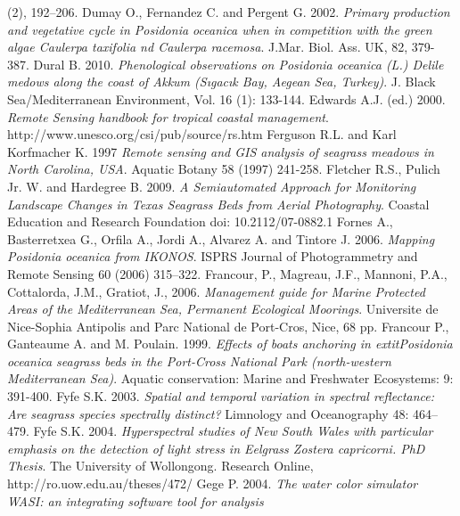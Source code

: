 \documentclass[10pt, a4paper]{article}
\begin{document}
\begin{thebibliography}{999}
(2), 192–206. \pageref{Duarte02}
Dumay O., Fernandez C. and Pergent G. 2002. \emph{Primary production and vegetative cycle
in \textit{Posidonia oceanica} when in competition with the green algae Caulerpa taxifolia nd
Caulerpa racemosa}. J.Mar. Biol. Ass. UK, 82, 379-387. \pageref{Dumay02}
Dural B. 2010. \emph{Phenological observations on \textit{Posidonia oceanica} (L.) Delile medows
along the coast of Akkum (Sıgacık Bay, Aegean Sea, Turkey)}. J. Black Sea/Mediterranean
Environment, Vol. 16 (1): 133-144. \pageref{Dural10}
Edwards A.J. (ed.) 2000. \emph{Remote Sensing handbook for tropical coastal management}.
http://www.unesco.org/csi/pub/source/rs.htm \pageref{Edwards00}
Ferguson R.L. and Karl Korfmacher K. 1997 \emph{Remote sensing and GIS analysis of seagrass
meadows in North Carolina, USA}. Aquatic Botany 58 (1997) 241-258. \pageref{Ferguson97}
Fletcher R.S., Pulich Jr. W. and Hardegree B. 2009. \emph{A Semiautomated Approach for
Monitoring Landscape Changes in Texas Seagrass Beds from Aerial Photography}. Coastal
Education and Research Foundation doi: 10.2112/07-0882.1 \pageref{Fletcher09}
Fornes A., Basterretxea G., Orfila A., Jordi A., Alvarez A. and Tintore J. 2006. \emph{Mapping
\textit{Posidonia oceanica} from IKONOS}. ISPRS Journal of Photogrammetry and Remote Sensing
60 (2006) 315–322. \pageref{Fornes06}
Francour, P., Magreau, J.F., Mannoni, P.A., Cottalorda, J.M., Gratiot, J., 2006.
\emph{Management guide for Marine Protected Areas of the Mediterranean Sea, Permanent
Ecological Moorings}. Universite de Nice-Sophia Antipolis and Parc National de Port-Cros,
Nice, 68 pp. \pageref{Francour06}
Francour P., Ganteaume A. and M. Poulain. 1999. \emph{Effects of boats anchoring in
\textit{	extit{Posidonia oceanica}} seagrass beds in the Port-Cross National Park (north-western
Mediterranean Sea)}. Aquatic conservation: Marine and Freshwater Ecosystems: 9: 391-400. \pageref{Francour99}
Fyfe S.K. 2003. \emph{Spatial and temporal variation in spectral reflectance: Are seagrass
species spectrally distinct?} Limnology and Oceanography 48: 464–479. \pageref{Fyfe03}
Fyfe S.K. 2004. \emph{Hyperspectral studies of New South Wales with particular emphasis on
the detection of light stress in Eelgrass Zostera capricorni. PhD Thesis}. The University of
Wollongong. Research Online, http://ro.uow.edu.au/theses/472/ \pageref{Fyfe03}
Gege P. 2004. \emph{The water color simulator WASI: an integrating software tool for analysis
}
\end{thebibliography}
\end{document}
